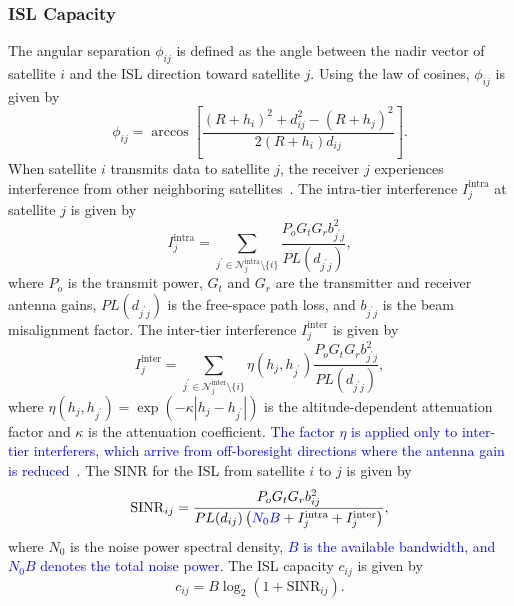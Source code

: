 \subsubsection{ISL Capacity}

The angular separation $\phi_{ij}$ is defined as the angle between the nadir vector of satellite $i$ and the ISL direction toward satellite $j$. Using the law of cosines, $\phi_{ij}$ is given by
\begin{equation} \label{eq:angular_separation}
\phi_{ij} = \arccos \left[\frac{(R+h_i)^2 + d_{ij}^2 - (R+h_j)^2}{2(R+h_i)d_{ij}}\right].
\end{equation}
When satellite $i$ transmits data to satellite $j$, the receiver $j$ experiences interference from other neighboring satellites~\cite{cao2025dense}. The intra-tier interference $I_j^{\mathrm{intra}}$ at satellite $j$ is given by
\begin{equation} \label{eq:interference_intra}
I_j^{\mathrm{intra}} = \sum_{j^{\prime} \in \mathcal{N}_{j}^{\mathrm{intra}} \setminus \{i\}} \frac{P_o G_t G_r b_{j^{\prime}j}^2}{PL(d_{j^{\prime}j})},
\end{equation}
where $P_o$ is the transmit power, $G_t$ and $G_r$ are the transmitter and receiver antenna gains, $PL(d_{j^{\prime}j})$ is the free-space path loss, and $b_{j^{\prime}j}$ is the beam misalignment factor. The inter-tier interference $I_j^{\mathrm{inter}}$ is given by
\begin{equation} \label{eq:interference_inter}
I_j^{\mathrm{inter}} = \sum_{j^{\prime} \in \mathcal{N}_j^{\mathrm{inter}}\setminus \{i\}} \eta(h_j,h_{j^{\prime}}) \frac{P_o G_t G_r b_{j^{\prime}j}^2}{PL(d_{j^{\prime}j})},
\end{equation}
where $\eta(h_j,h_{j^{\prime}}) = \exp(-\kappa |h_j-h_{j^{\prime}}|)$ is the altitude-dependent attenuation factor and $\kappa$ is the attenuation coefficient. \textcolor{blue}{The factor $\eta$ is applied only to inter-tier interferers, which arrive from off-boresight directions where the antenna gain is reduced~\cite{cao2025dense}.} The SINR for the ISL from satellite $i$ to $j$ is given by~\cite{cao2025dense}
\begin{equation} \label{eq:sinr}
\mathrm{SINR}_{ij} = \frac{P_o G_t G_r b_{ij}^2}{PL(d_{ij})\left(\textcolor{blue}{N_0 B} + I_{j}^{\mathrm{intra}} + I_{j}^{\mathrm{inter}}\right)},
\end{equation}
where $N_0$ is the noise power spectral density\textcolor{blue}{, $B$ is the available bandwidth, and $N_0 B$ denotes the total noise power}. The ISL capacity $c_{ij}$ is given by
\begin{equation}\label{eq:link_capacity}
    c_{ij} = B \log_2(1 + \mathrm{SINR}_{ij}).
\end{equation}

